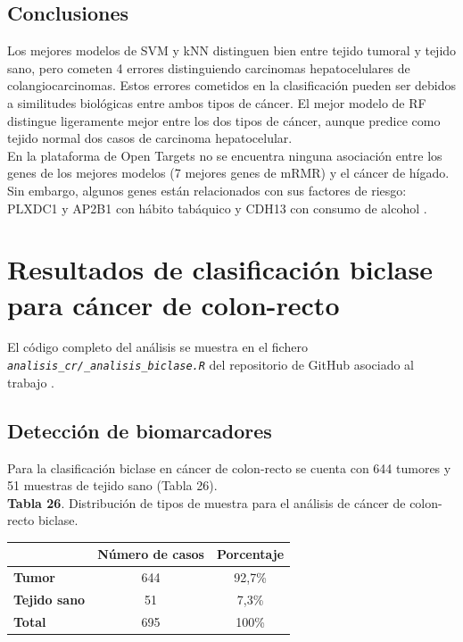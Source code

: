 \subsection{Conclusiones}

Los mejores modelos de SVM y kNN distinguen bien entre tejido tumoral y tejido sano, pero cometen 4 errores distinguiendo carcinomas hepatocelulares de colangiocarcinomas. Estos errores cometidos en la clasificación pueden ser debidos a similitudes biológicas entre ambos tipos de cáncer. El mejor modelo de RF distingue ligeramente mejor entre los dos tipos de cáncer, aunque predice como tejido normal dos casos de carcinoma hepatocelular.\\

En la plataforma de Open Targets \cite{OpenTargets2020} no se encuentra ninguna asociación entre los genes de los mejores modelos (7 mejores genes de mRMR) y el cáncer de hígado. Sin embargo, algunos genes están relacionados con sus factores de riesgo: PLXDC1 y AP2B1 con hábito tabáquico \cite{Liu2019} y CDH13 con consumo de alcohol \cite{Schumann2016}.

\section{Resultados de clasificación biclase para cáncer de colon-recto}

El código completo del análisis se muestra en el fichero \textit{\texttt{analisis\_cr/\_analisis\_biclase.R}} del repositorio de GitHub asociado al trabajo \cite{Redondo-Sanchez2020}.

\subsection{Detección de biomarcadores}

Para la clasificación biclase en cáncer de colon-recto se cuenta con 644 tumores y 51 muestras de tejido sano (Tabla 26).\\

\textbf{Tabla 26}. Distribución de tipos de muestra para el análisis de cáncer de colon-recto biclase.

\begin{table}[H]
	\centering
	\begin{tabular}{lcc}
		\cline{2-3}
		& \textbf{Número de casos} & \textbf{Porcentaje} \\ \hline
		\textbf{Tumor}     & 644        & 92,7\%              \\
		\textbf{Tejido sano} & 51         & 7,3\%              \\ \hline
		\textbf{Total}       & 695        & 100\%               \\ \hline
	\end{tabular}
\end{table}

